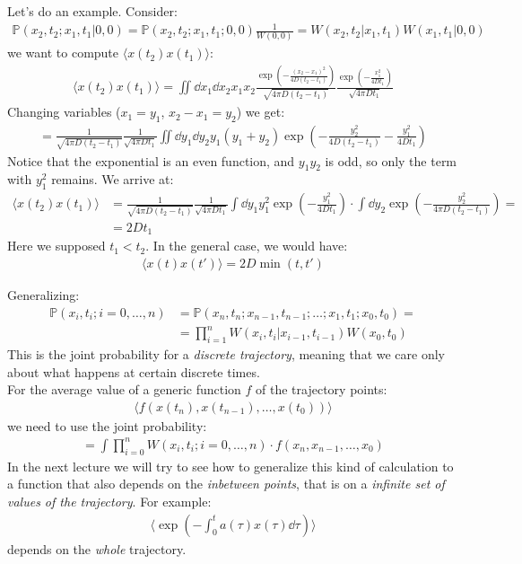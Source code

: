\documentclass[../template.tex]{subfiles}
\begin{document}
Let's do an example. Consider:
\begin{align*}
    \mathbb{P}(x_2, t_2; x_1, t_1 | 0, 0) = \mathbb{P}(x_2, t_2; x_1, t_1; 0,0)\frac{1}{W(0,0)} = W(x_2, t_2 | x_1, t_1) W(x_1, t_1 | 0,0)
\end{align*}
we want to compute $\langle x(t_2) x(t_1) \rangle$:
\begin{align*}
    \langle x(t_2) x(t_1) \rangle = \iint \dd{x_1} \dd{x_2} x_1 x_2 \frac{\exp\left(-\frac{(x_2 - x_1)^2}{4D(t_2 -t_1)} \right) }{\sqrt{4 \pi D (t_2 -t_1)}} \frac{\exp\left(-\frac{x_1^2}{4 D t_1} \right)}{\sqrt{4 \pi D t_1}} 
\end{align*}
Changing variables ($x_1 = y_1$, $x_2 - x_1 = y_2$) we get:
\begin{align*}
    = \frac{1}{\sqrt{4 \pi D (t_2-t_1) }}  \frac{1}{\sqrt{4 \pi D t_1}} \iint \dd{y_1} \dd{y_2} y_1 (y_1 + y_2)\exp\left(-\frac{y_2^2}{4D(t_2 -t_1)} - \frac{y_1^2}{4D t_1} \right) 
\end{align*}
Notice that the exponential is an even function, and $y_1 y_2$ is odd, so only the term with $y_1^2$ remains. We arrive at:
\begin{align*}
    \langle x(t_2) x(t_1) \rangle &= \frac{1}{\sqrt{4 \pi D(t_2-t_1)}} \frac{1}{\sqrt{4 \pi D t_1}} \int \dd{y_1} y_1^2 \exp\left(-\frac{y_1^2}{4 D t_1} \right)  \cdot \int \dd{y_2} \exp\left(-\frac{y_2^2}{4 \pi D (t_2-t_1) } \right) =\\
    &= 2D t_1
\end{align*}
Here we supposed $t_1 < t_2$. In the general case, we would have:
\begin{align*}
    \langle x(t) x(t') \rangle = 2D \min(t, t')
\end{align*} 

Generalizing:
\begin{align*}
    \mathbb{P}(x_i, t_i; i=0, \dots, n) &= \mathbb{P}(x_n, t_n; x_{n-1}, t_{n-1}; \dots; x_1, t_1; x_0, t_0) =\\
    &= \prod_{i=1}^n W(x_i, t_i | x_{i-1}, t_{i-1}) W(x_0, t_0)
\end{align*}
This is the joint probability for a \textit{discrete trajectory}, meaning that we care only about what happens at certain discrete times.\\
For the average value of a generic function $f$ of the trajectory points:
\begin{align*}
    \langle f(x(t_n), x(t_{n-1}), \dots, x(t_0)) \rangle
\end{align*}  
we need to use the joint probability:
\begin{align*}
    = \int \prod_{i=0}^n W(x_i, t_i; i=0, \dots, n) \cdot f(x_n, x_{n-1}, \dots, x_0)
\end{align*}
In the next lecture we will try to see how to generalize this kind of calculation to a function that also depends on the \textit{inbetween points}, that is on a \textit{infinite set of values of the trajectory}. For example:
\begin{align*}
    \langle \exp \left(-\int_0^t a(\tau) x(\tau) \dd{\tau}\right) \rangle
\end{align*}  
depends on the \textit{whole} trajectory.
\end{document}
